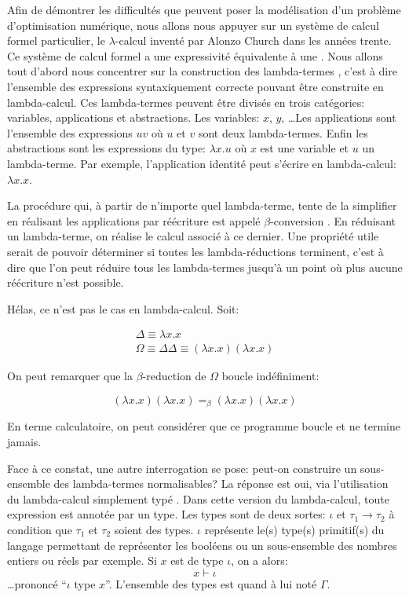 Afin de démontrer les difficultés que peuvent poser la modélisation
d'un problème d'optimisation numérique, nous allons nous appuyer sur
un système de calcul formel particulier, le $\lambda$-calcul
 inventé par Alonzo Church 
dans les années trente. Ce système de calcul formel a une expressivité
équivalente à une . Nous allons tout d'abord
nous concentrer sur la construction des lambda-termes
, c'est à dire l'ensemble des expressions
syntaxiquement correcte pouvant être construite en lambda-calcul. Ces
lambda-termes peuvent être divisés en trois catégories: variables,
applications et abstractions. Les variables: $x$, $y$, \ldots Les
applications sont l'ensemble des expressions $u v$ où $u$ et $v$ sont
deux lambda-termes. Enfin les abstractions sont les expressions du
type: $\lambda x.u$ où $x$ est une variable et $u$ un
lambda-terme. Par exemple, l'application identité peut s'écrire en
lambda-calcul: $\lambda x.x$.


La procédure qui, à partir de n'importe quel lambda-terme, tente de la
simplifier en réalisant les applications par réécriture est appelé
$\beta$-conversion . En réduisant un
lambda-terme, on réalise le calcul associé à ce dernier. Une propriété
utile serait de pouvoir déterminer si toutes les lambda-réductions
terminent, c'est à dire que l'on peut réduire tous les lambda-termes
jusqu'à un point où plus aucune réécriture  n'est
possible.


Hélas, ce n'est pas le cas en lambda-calcul. Soit:

\begin{eqnarray}
  \Delta \equiv \lambda x.x\\
  \Omega \equiv \Delta \Delta \equiv (\lambda x.x) (\lambda x.x)
\end{eqnarray}

 On peut remarquer que la $\beta$-reduction de $\Omega$ boucle
 indéfiniment:

\begin{equation}
  (\lambda x.x) (\lambda x.x) =_{\beta} (\lambda x.x) (\lambda x.x)
\end{equation}

En terme calculatoire, on peut considérer que ce programme boucle et
ne termine jamais.


Face à ce constat, une autre interrogation se pose: peut-on construire
un sous-ensemble des lambda-termes normalisables? La réponse est oui,
via l'utilisation du lambda-calcul simplement typé
. Dans cette version du
lambda-calcul, toute expression est annotée par un type. Les types
sont de deux sortes: $\iota$ et $\tau_1 \rightarrow \tau_2$ à
condition que $\tau_1$ et $\tau_2$ soient des types. $\iota$
représente le(s) type(s) primitif(s) du langage permettant de
représenter les booléens ou un sous-ensemble des nombres entiers ou
réels par exemple. Si $x$ est de type $\iota$, on a alors:
%
\begin{equation}
  x \vdash \iota
\end{equation}
%
\ldots prononcé ``$\iota$ type $x$''. L'ensemble des types est quand à
lui noté $\Gamma$.


